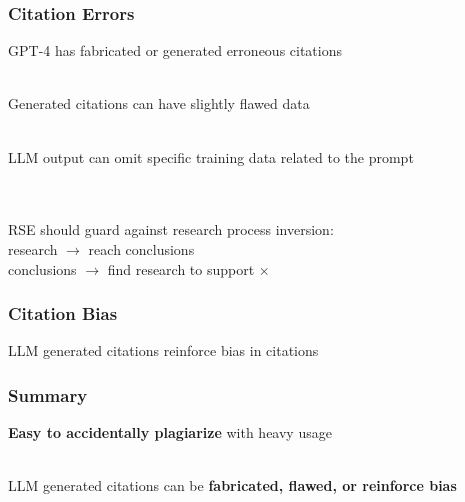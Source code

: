 \documentclass{beamer}
\begin{document}

\begin{frame}
\begin{center}
\frametitle{Citation Errors}

GPT-4 has fabricated or generated erroneous citations

~\\

Generated citations can have slightly flawed data

~\\

LLM output can omit specific training data related to the prompt

~\\
~\\

RSE should guard against research process inversion:\\research $\rightarrow$ reach conclusions {\color{green} \checkmark}\\conclusions $\rightarrow$ find research to support {\color{red} $\times$}

\end{center}
\end{frame}


\begin{frame}
\begin{center}
\frametitle{Citation Bias}

LLM generated citations reinforce bias in citations

\end{center}
\end{frame}


\begin{frame}
\begin{center}
\frametitle{Summary}

\textbf{Easy to accidentally plagiarize} with heavy usage

~\\

LLM generated citations can be \textbf{fabricated, flawed, or reinforce bias}

~\\
~\\


\end{center}
\end{frame}
\end{document}
